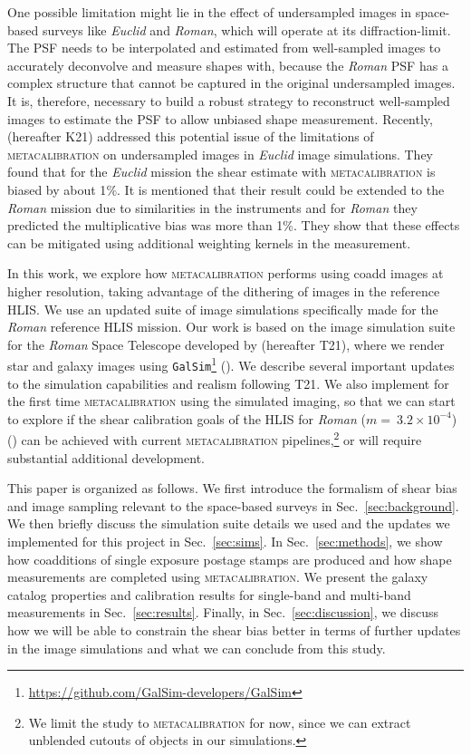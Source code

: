 \documentclass[fleqn,usenatbib]{mnras}
\begin{document}
One possible limitation might lie in the effect of undersampled images in space-based surveys like \emph{Euclid} and \emph{Roman}, which will operate at its diffraction-limit. The PSF needs to be interpolated and estimated from well-sampled images to accurately deconvolve and measure shapes with, because the \emph{Roman} PSF has a complex structure that cannot be captured in the original undersampled images. It is, therefore, necessary to build a robust strategy to reconstruct well-sampled images to estimate the PSF to allow unbiased shape measurement.
Recently, \cite{2021MNRAS.502.4048K} (hereafter K21) addressed this potential issue of the limitations of \textsc{metacalibration} on undersampled images in \emph{Euclid} image simulations. They found that for the \emph{Euclid} mission the shear estimate with \textsc{metacalibration} is biased by about 1$\%$. It is mentioned that their result could be extended to the \emph{Roman} mission due to similarities in the instruments and for \emph{Roman} they predicted the multiplicative bias was more than 1\%. They show that these effects can be mitigated using additional weighting kernels in the measurement. 

In this work, we explore how \textsc{metacalibration} performs using coadd images at higher resolution, taking advantage of the dithering of images in the reference HLIS. We use an updated suite of image simulations specifically made for the \emph{Roman} reference HLIS mission. Our work is based on the image simulation suite for the \emph{Roman} Space Telescope developed by \cite{2021MNRAS.501.2044T} (hereafter T21), where we render star and galaxy images using \texttt{GalSim}\footnote{\url{ https://github.com/GalSim-developers/GalSim}} (\citealt{2015A&C....10..121R}). We describe several important updates to the simulation capabilities and realism following T21. We also implement for the first time \textsc{metacalibration} using the simulated imaging, so that we can start to explore if the shear calibration goals of the HLIS for \emph{Roman} ($m=~3.2\times10^{-4}$) (\citealt{2018arXiv180403628D}) can be achieved with current \textsc{metacalibration} pipelines,\footnote{We limit the study to \textsc{metacalibration} for now, since we can extract unblended cutouts of objects in our simulations.} or will require substantial additional development. \par


This paper is organized as follows. We first introduce the formalism of shear bias and image sampling relevant to the space-based surveys in Sec.~\ref{sec:background}. We then briefly discuss the simulation suite details we used and the updates we implemented for this project in Sec.~\ref{sec:sims}. In Sec.~\ref{sec:methods}, we show how coadditions of single exposure postage stamps are produced and how shape measurements are completed using \textsc{metacalibration}. We present the galaxy catalog properties and calibration results for single-band and multi-band measurements in Sec.~\ref{sec:results}. Finally, in Sec.~\ref{sec:discussion}, we discuss how we will be able to constrain the shear bias better in terms of further updates in the image simulations and what we can conclude from this study. 
\end{document}
